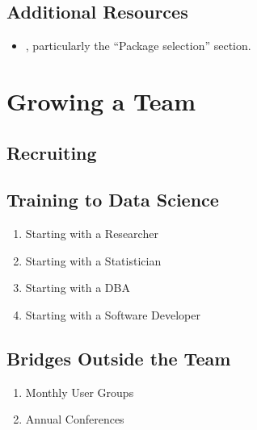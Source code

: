 \documentclass[
]{book}
\providecommand{\tightlist}{%
  \setlength{\itemsep}{0pt}\setlength{\parskip}{0pt}}
\begin{document}
\hypertarget{additional-resources}{%
\section{Additional Resources}\label{additional-resources}}

\begin{itemize}
\tightlist
\item
  \citep{gillespie}, particularly the ``Package selection'' section.
\end{itemize}

\hypertarget{team}{%
\chapter{Growing a Team}\label{team}}

\hypertarget{recruiting}{%
\section{Recruiting}\label{recruiting}}

\hypertarget{training-to-data-science}{%
\section{Training to Data Science}\label{training-to-data-science}}

\begin{enumerate}
\def\labelenumi{\arabic{enumi}.}
\tightlist
\item
  Starting with a Researcher
\item
  Starting with a Statistician
\item
  Starting with a DBA
\item
  Starting with a Software Developer
\end{enumerate}

\hypertarget{bridges-outside-the-team}{%
\section{Bridges Outside the Team}\label{bridges-outside-the-team}}

\begin{enumerate}
\def\labelenumi{\arabic{enumi}.}
\tightlist
\item
  Monthly User Groups
\item
  Annual Conferences
\end{enumerate}

\cleardoublepage
\end{document}
